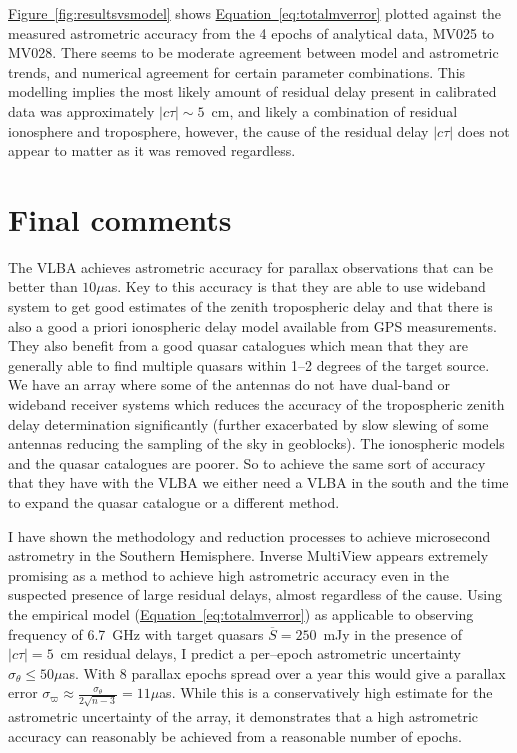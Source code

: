 		\hyperref[fig:resultsvsmodel]{Figure~\ref*{fig:resultsvsmodel}} shows \hyperref[eq:totalmverror]{Equation~\ref*{eq:totalmverror}} plotted against the measured astrometric accuracy from the 4 epochs of analytical data, MV025 to MV028. There seems to be moderate agreement between model and astrometric trends, and numerical agreement for certain parameter combinations. This modelling implies the most likely amount of residual delay present in calibrated data was approximately $|c\tau|\sim5$~cm, and likely a combination of residual ionosphere and troposphere, however, the cause of the residual delay $|c\tau|$ does not appear to matter as it was removed regardless. %
		
\clearpage
\section{Final comments}
	The VLBA achieves astrometric accuracy for parallax observations that can be better than $10\mu$as. Key to this accuracy is that they are able to use wideband system to get good estimates of the zenith tropospheric delay and that there is also a good a priori ionospheric delay model available from GPS measurements. They also benefit from a good quasar catalogues which mean that they are generally able to find multiple quasars within 1--2 degrees of the target source. We have an array where some of the antennas do not have dual-band or wideband receiver systems which reduces the accuracy of the tropospheric zenith delay determination significantly (further exacerbated by slow slewing of some antennas reducing the sampling of the sky in geoblocks). The ionospheric models and the quasar catalogues are poorer. So to achieve the same sort of accuracy that they have with the VLBA we either need a VLBA in the south and the time to expand the quasar catalogue or a different method.
	
	
	I have shown the methodology and reduction processes to achieve microsecond astrometry in the Southern Hemisphere. Inverse MultiView appears extremely promising as a method to achieve high astrometric accuracy even in the suspected presence of large residual delays, almost regardless of the cause. Using the empirical model (\hyperref[eq:totalmverror]{Equation~\ref*{eq:totalmverror}}) as applicable to \spirals\space observing frequency of 6.7~GHz with target quasars $\overline{S}=250$~mJy in the presence of $|c\tau|=5$~cm residual delays, I predict a per--epoch astrometric uncertainty $\sigma_\theta\le50\mu$as. With 8 parallax epochs spread over a year this would give a parallax error $\sigma_\varpi\approx\frac{\sigma_\theta}{2\sqrt{n-3}}=11\mu$as. While this is a conservatively high estimate for the astrometric uncertainty of the array, it demonstrates that a high astrometric accuracy can reasonably be achieved from a reasonable number of epochs.
	
